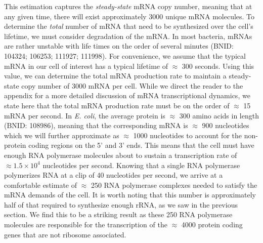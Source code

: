 This estimation captures the \textit{steady-state} mRNA copy number, meaning
that at any given time, there will exist approximately 3000 unique mRNA
molecules. To determine the \textit{total} number of mRNA that need to be
synthesized over the cell's lifetime, we must consider degradation of the mRNA.
In most bacteria, mRNAs are rather unstable with life times on the order of
several minutes (BNID: 104324; 106253; 111927; 111998). For
convenience, we assume that the typical mRNA in our cell of interest has a
typical lifetime of $\approx$ 300 seconds. Using this value, we can determine
the total mRNA production rate to maintain a steady-state copy number of 3000
mRNA per cell. While we direct the reader to the appendix for a more detailed
discussion of mRNA transcriptional dynamics, we state here that the total mRNA
production rate must be on the order of $\approx$ 15 mRNA per second. In
\textit{E. coli}, the average protein is $\approx$ 300 amino acids in length
(BNID: 108986), meaning that the corresponding mRNA is
$\approx$ 900 nucleotides which we will further approximate as $\approx$ 1000
nucleotides to account for the non-protein coding regions on the 5' and
3' ends. This means that the cell must have enough RNA polymerase molecules
about to sustain a transcription rate of $\approx 1.5 \times 10^4$ nucleotides
per second. Knowing that a single RNA polymerase polymerizes RNA at a clip of 40
nucleotides per second, we arrive at a comfortable estimate of $\approx$ 250 RNA
polymerase complexes needed to satisfy the mRNA demands of the cell. It is worth
noting that this number is approximately half of that required to synthesize
enough rRNA, as we saw in the previous section. We find this to be a striking
result as these 250 RNA polymerase molecules are responsible for the
transcription of the $\approx$ 4000 protein coding genes that are not ribosome
associated.

